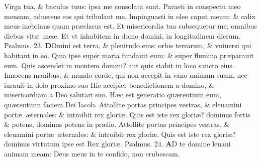 \documentclass[a5paper,10pt]{book}
\def\ae{æ}
\begin{document}
\begin{multicols*}{2}
\newline \color{red} V\color{black}irga tua, \& baculus tuus: ipsa me consolata sunt.
\newline \color{red} P\color{black}arasti in conspectu meo mensam, aduersus eos qui tribulant me.
\newline \color{red} I\color{black}mpinguasti in oleo caput meum: \& calix meus inebrians quam pr\ae clarus est.
\newline \color{red} E\color{black}t misericordia tua subsequetur me, omnibus diebus vit\ae \ me\ae .
\newline \color{red} E\color{black}t vt inhabitem in domo domini, in longitudinem dierum. \quad \color{red} Psalmus. 23. \color{black}
\vspace{-.5em}
\lettrine[lines=2]{\bfseries \color{red} D}{}Omini est terra, \& plenitudo eius: orbis terrarum, \& vniuersi qui habitant in eo.
\newline \color{red} Q\color{black}uia ipse super maria fundauit eum: \& super flumina pr\ae parauit eum.
\newline \color{red} Q\color{black}uis ascendet in montem domini? aut quis stabit in loco sancto eius.
\newline \color{red} I\color{black}nnocens manibus, \& mundo corde, qui non accepit in vano animam suam, nec iurauit in dolo proximo suo %
\newline \color{red} H\color{black}ic accipiet benedictionem a domino, \& misericordiam a Deo salutari suo.
\newline \color{red} H\color{black}\ae c est generatio qu\ae rentium eum, qu\ae rentium faciem Dei Iacob.
\newline \color{red} A\color{black}ttollite portas principes vestras, \& eleuamini port\ae \ \ae ternales: \& introibit rex glori\ae .
\newline \color{red} Q\color{black}uis est iste rex glori\ae ? dominus fortis \& potens, dominus potens in pr\ae lio.
\newline \color{red} A\color{black}ttollite portas principes vestras, \& eleuamini port\ae \ \ae ternales: \& introibit rex glori\ae .
\newline \color{red} Q\color{black}uis est iste rex glori\ae ? dominus virtutum ipse est Rex glori\ae .
\newline \color{red} Psalmus. 24. \color{black}
\vspace{-.5em}
\lettrine[lines=2]{\bfseries \color{red} A}{}D te domine leuaui animam meam: Deus meus in te confido, non erubescam.

\end{multicols*}
\end{document}
